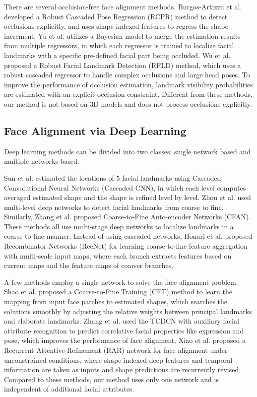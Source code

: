 \documentclass[journal]{IEEEtran}
\begin{document}
There are several occlusion-free face alignment methods. Burgos-Artizzu et al. \cite{burgos2013robust} developed a Robust Cascaded Pose Regression (RCPR) method to detect occlusions explicitly, and uses shape-indexed features to regress the shape increment. Yu et al. \cite{yu2014consensus} utilizes a Bayesian model to merge the estimation results from multiple regressors, in which each regressor is trained to localize facial landmarks with a specific pre-defined facial part being occluded. Wu et al. \cite{wu2015robust} proposed a Robust Facial Landmark Detection (RFLD) method, which uses a robust cascaded regressor to handle complex occlusions and large head poses. To improve the performance of occlusion estimation, landmark visibility probabilities are estimated with an explicit occlusion constraint. Different from these methods, our method is not based on 3D models and does not process occlusions explicitly.

\subsection{Face Alignment via Deep Learning}

Deep learning methods can be divided into two classes: single network based and multiple networks based.

Sun et al. \cite{sun2013deep} estimated the locations of $5$ facial landmarks using Cascaded Convolutional Neural Networks (Cascaded CNN), in which each level computes averaged estimated shape and the shape is refined level by level. Zhou et al. \cite{zhou2013extensive} used multi-level deep networks to detect facial landmarks from coarse to fine. Similarly, Zhang et al. \cite{zhang2014coarse} proposed Coarse-to-Fine Auto-encoder Networks (CFAN). These methods all use multi-stage deep networks to localize landmarks in a coarse-to-fine manner. Instead of using cascaded networks, Honari et al. \cite{honari2016recombinator} proposed Recombinator Networks (RecNet) for learning coarse-to-fine feature aggregation with multi-scale input maps, where each branch extracts features based on current maps and the feature maps of coarser branches.

A few methods employ a single network to solve the face alignment problem. Shao et al. \cite{shao2016learning} proposed a Coarse-to-Fine Training (CFT) method to learn the mapping from input face patches to estimated shapes, which searches the solutions smoothly by adjusting the relative weights between principal landmarks and elaborate landmarks. Zhang et al. \cite{zhang2014facial,zhang2015learning} used the TCDCN with auxiliary facial attribute recognition to predict correlative facial properties like expression and pose, which improves the performance of face alignment. Xiao et al. \cite{xiao2016robust} proposed a Recurrent Attentive-Refinement (RAR) network for face alignment under unconstrained conditions, where shape-indexed deep features and temporal information are taken as inputs and shape predictions are recurrently revised. Compared to these methods, our method uses only one network and is independent of additional facial attributes.
\end{document}
